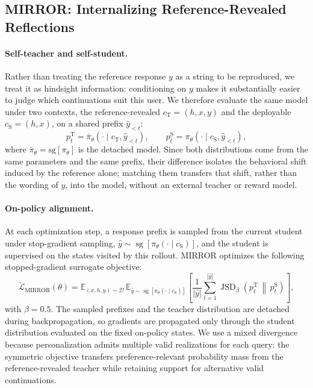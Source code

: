 \documentclass{article} %
\DeclareMathOperator{\JSD}{JSD}
\newcommand{\sg}[1]{\mathrm{sg}\!\left[#1\right]}
\begin{document}
\subsection{MIRROR: Internalizing Reference-Revealed Reflections}
\label{sec:mirror}

\paragraph{Self-teacher and self-student.}
Rather than treating the reference response $y$ as a string to be reproduced, we treat it
as hindsight information: conditioning on $y$ makes it substantially easier to judge which
continuations suit this user. We therefore evaluate the same model under two contexts, the
reference-revealed $c_{\mathrm{T}} = (h, x, y)$ and the deployable
$c_{\mathrm{S}} = (h, x)$, on a shared prefix $\hat{y}_{<t}$:
\begin{equation}
    p^{\mathrm{T}}_t = \bar{\pi}_\theta\!\left(\cdot \mid c_{\mathrm{T}}, \hat{y}_{<t}\right),
    \qquad
    p^{\mathrm{S}}_t = \pi_\theta\!\left(\cdot \mid c_{\mathrm{S}}, \hat{y}_{<t}\right),
    \label{eq:teacher-student}
\end{equation}
where $\bar{\pi}_\theta = \sg{\pi_\theta}$ is the detached model. Since both distributions
come from the same parameters and the same prefix, their difference isolates the behavioral
shift induced by the reference alone; matching them transfers that shift, rather than the
wording of $y$, into the model, without an external teacher or reward model.

\paragraph{On-policy alignment.}
At each optimization step, a response prefix is sampled from the current
student under stop-gradient sampling,
$\hat{y}\sim\operatorname{sg}[\pi_\theta(\cdot\mid c_{\mathrm{S}})]$,
and the student is supervised on the states visited by this rollout. MIRROR
optimizes the following stopped-gradient surrogate objective:
\begin{equation}
    \widetilde{\mathcal{L}}_{\mathrm{MIRROR}}(\theta)
    =
    \mathbb{E}_{(x,h,y)\sim\mathcal{D}}\,
    \mathbb{E}_{\hat{y}\sim
        \operatorname{sg}[\pi_\theta(\cdot\mid c_{\mathrm{S}})]}
    \left[
      \frac{1}{|\hat{y}|}\sum_{t=1}^{|\hat{y}|}
      \JSD_\beta\!\left(p^{\mathrm{T}}_t
      \,\middle\|\,p^{\mathrm{S}}_t\right)
    \right],
    \label{eq:mirror}
\end{equation}
with $\beta=0.5$. The sampled prefixes and the teacher distribution are
detached during backpropagation, so gradients are propagated only through
the student distribution evaluated on the fixed on-policy states. We use a
mixed divergence because personalization admits multiple valid realizations
for each query: the symmetric objective transfers preference-relevant
probability mass from the reference-revealed teacher while retaining support
for alternative valid continuations.
\end{document}
